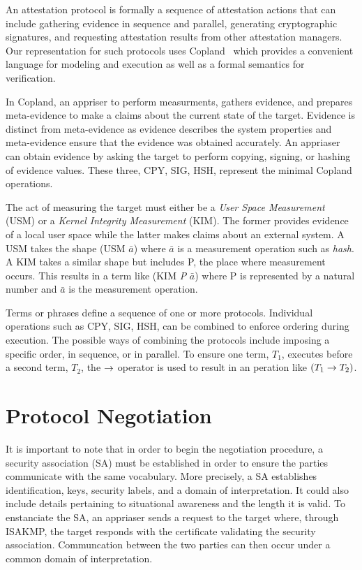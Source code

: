 \documentclass[sigconf,authordraft]{acmart}
\newcommand{\bara}{\bar{a}}
\begin{document}
An attestation protocol is formally a sequence of attestation actions
that can include gathering evidence in sequence and parallel,
generating cryptographic signatures, and requesting attestation
results from other attestation managers.  Our representation for such
protocols uses Copland~\citep{Ramsdell:2019aa} which provides a
convenient language for modeling and execution as well as a formal
semantics for verification.

In Copland, an appriser to perform measurments, gathers evidence, and
prepares meta-evidence to make a claims about the current state of the
target. Evidence is distinct from meta-evidence as evidence describes
the system properties and meta-evidence ensure that the evidence was
obtained accurately. An appriaser can obtain evidence by asking the
target to perform copying, signing, or hashing of evidence
values. These three, CPY, SIG, HSH, represent the minimal Copland
operations.

The act of measuring the target must either be a \emph{User Space
  Measurement} (USM) or a \emph{Kernel Integrity Measurement}
(KIM). The former provides evidence of a local user space while the
latter makes claims about an external system. A USM takes the shape
(USM $\bara$) where $\bara$ is a measurement operation such as
\emph{hash}. A KIM takes a similar shape but includes P, the place
where measurement occurs. This results in a term like (KIM \emph{P}
$\bara$) where P is represented by a natural number and $\bara$ is the
measurement operation.

Terms or phrases define a sequence of one or more
protocols. Individual operations such as CPY, SIG, HSH, can be
combined to enforce ordering during execution. The possible ways of
combining the protocols include imposing a specific order, in
sequence, or in parallel.  To ensure one term, $T_1$, executes before
a second term, $T_2$, the $\to$ operator is used to result in an
peration like $(T_1\to T_2)$.


\section{Protocol Negotiation}

It is important to note that in order to begin the negotiation
procedure, a security association (SA) must be established in order to
ensure the parties communicate with the same vocabulary. More
precisely, a SA establishes identification, keys, security labels, and
a domain of interpretation. It could also include details pertaining
to situational awareness and the length it is valid. To enstanciate
the SA, an appriaser sends a request to the target where, through
ISAKMP, the target responds with the certificate validating the
security association. Communcation between the two parties can then
occur under a common domain of interpretation.
\end{document}

